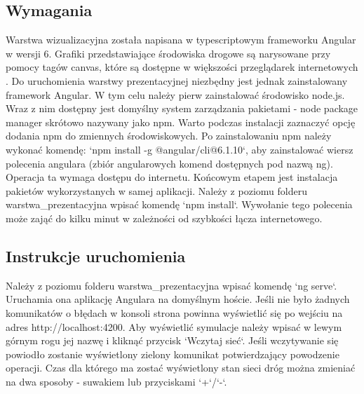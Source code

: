 \documentclass[12pt]{book}
\theoremstyle{plain}
\begin{document}
\subsection{Wymagania}
Warstwa wizualizacyjna została napisana w typescriptowym frameworku Angular w wersji 6. Grafiki przedstawiające środowiska drogowe są narysowane przy pomocy tagów canvas, które są dostępne w większości przeglądarek internetowych \cite{canvas}. Do uruchomienia warstwy prezentacyjnej niezbędny jest jednak zainstalowany framework Angular. W tym celu należy pierw zainstalować środowisko node.js. Wraz z nim dostępny jest domyślny system zarządzania pakietami - node package manager skrótowo nazywany jako npm. Warto podczas instalacji zaznaczyć opcję dodania npm do zmiennych środowiskowych. Po zainstalowaniu npm należy wykonać komendę: `npm install -g @angular/cli@6.1.10`, aby zainstalować wiersz polecenia angulara (zbiór angularowych komend dostępnych pod nazwą ng). Operacja ta wymaga dostępu do internetu. Końcowym etapem jest instalacja pakietów wykorzystanych w samej aplikacji. Należy z poziomu folderu warstwa\_prezentacyjna wpisać komendę `npm install`. Wywołanie tego polecenia może zająć do kilku minut w zależności od szybkości łącza internetowego. 
\subsection{Instrukcje uruchomienia}
Należy z poziomu folderu warstwa\_prezentacyjna wpisać komendę `ng serve`. Uruchamia ona aplikację Angulara na domyślnym hoście. Jeśli nie było żadnych komunikatów o błędach w konsoli strona powinna wyświetlić się po wejściu na adres http://localhost:4200. Aby wyświetlić symulacje należy wpisać w lewym górnym rogu jej nazwę i kliknąć przycisk `Wczytaj sieć`. Jeśli wczytywanie się powiodło zostanie wyświetlony zielony komunikat potwierdzający powodzenie operacji. Czas dla którego ma zostać wyświetlony stan sieci dróg można zmieniać na dwa sposoby - suwakiem lub przyciskami `+`/`-`.




\end{document}
